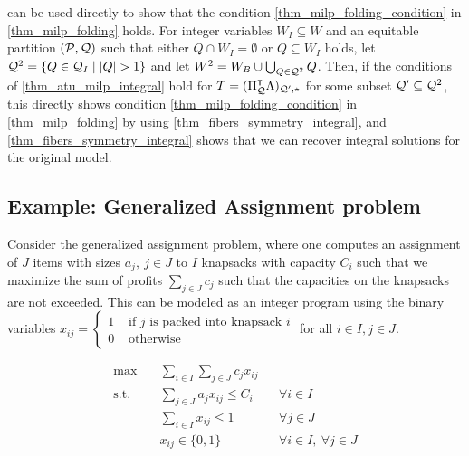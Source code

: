 \documentclass[pdflatex,sn-mathphys-num]{sn-jnl}%
\theoremstyle{thmstyleone}%
\theoremstyle{thmstylethree}%
\theoremstyle{thmstyletwo}%
\begin{document}
 can be used directly to show that the condition \eqref{thm_milp_folding_condition} in \cref{thm_milp_folding} holds. For integer variables $W_I\subseteq W$ and an equitable partition $(\mathcal{P},\mathcal{Q})$ such that either $Q\cap W_I = \emptyset$ or $Q\subseteq W_I$ holds, let $\mathcal{Q}^2 = \{Q \in \mathcal{Q}_I \mid |Q| > 1\}$ and let $W^2 = W_B \cup \bigcup_{Q\in \mathcal{Q}^2} Q$. Then, if the conditions of  \cref{thm_atu_milp_integral} hold for $T=(\Pi_{\mathcal{Q}}^{\intercal} \Lambda)_{\mathcal{Q}',\star}$ for some subset $\mathcal{Q}'\subseteq \mathcal{Q}^2$, this directly shows condition \eqref{thm_milp_folding_condition} in \cref{thm_milp_folding} by using \cref{thm_fibers_symmetry_integral}, and \cref{thm_fibers_symmetry_integral} shows that we can recover integral solutions for the original model.

\subsection{Example: Generalized Assignment problem}
\label{sec_example}
Consider the generalized assignment problem, where one computes an assignment of $J$ items with sizes $a_j, ~j\in J$ to $I$ knapsacks with capacity $C_i$ such that we maximize the sum of profits $\sum_{j\in J} c_j$ such that the capacities on the knapsacks are not exceeded. This can be modeled as an integer program using the binary variables $x_{ij} = \begin{cases}
    1 &\text{ if $j$ is packed into knapsack $i$}\\
    0 &\text{ otherwise}
\end{cases}$ for all $i\in I, j\in J$.

\begin{subequations}
\label{eq_mk_orig}
\begin{align}
\max\quad & \sum_{i\in I}\sum_{j\in J} c_j x_{ij} \\
\text{s.t.}\quad 
& \sum_{j\in J} a_j x_{ij} \leq C_i 
&& \forall i\in I \\
& \sum_{i\in I} x_{ij} \leq 1 
&& \forall j\in J \label{eq_mk_orig_item_packing}\\
& x_{ij} \in \{0,1\} 
&& \forall i\in I,\ \forall j\in J \label{eq_mk_orig_bounds}
\end{align}
\end{subequations}
\end{document}
